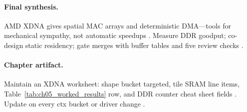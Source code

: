 \paragraph{Final synthesis.}
AMD XDNA gives spatial MAC arrays and deterministic DMA---tools for mechanical sympathy, not automatic speedups \citep{amd2024xdna,amd2024aie,patel2025llminference,liu2024deepseekv3,dao2022flashattention,yirage2026,chen2020compilerbasedhardw,taxbreak2026,memoryfloor2026}.
Measure DDR goodput; co-design static residency; gate merges with buffer tables and five review checks \citep{taxbreak2026,memoryfloor2026,dlbook,patel2025llminference,amd2024xdna,amd2024aie}.

\paragraph{Chapter artifact.}
Maintain an XDNA worksheet: shape bucket targeted, tile SRAM line items, Table~\ref{tab:ch05_worked_results} row, and DDR counter cheat sheet fields \citep{patel2025llminference,taxbreak2026,memoryfloor2026,yirage2026,amd2024xdna,amd2024aie}.
Update on every ctx bucket or driver change \citep{kwon2023vllm,chen2020compilerbasedhardw}.

